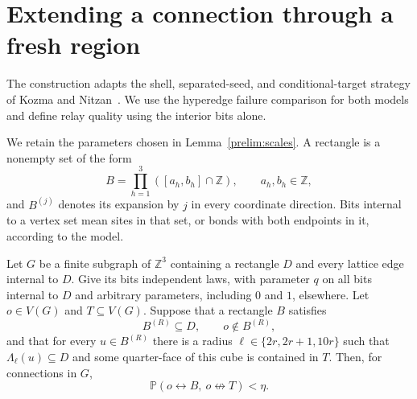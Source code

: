 \section{Extending a connection through a fresh region}
\label{sec:extension}

The construction adapts the shell, separated-seed, and conditional-target
strategy of Kozma and Nitzan~\cite[Section~4, Lemma~10]{KozmaNitzan2024}.
We use the hyperedge failure comparison for both models and define relay
quality using the interior bits alone.

We retain the parameters chosen in Lemma~\ref{prelim:scales}.
A rectangle is a nonempty set of the form
\[
 B=\prod_{h=1}^3([a_h,b_h]\cap\mathbb Z),
 \qquad a_h,b_h\in\mathbb Z,
\]
and $B^{(j)}$ denotes its expansion by $j$ in every coordinate direction.
Bits internal to a vertex set mean sites in that set, or bonds with both
endpoints in it, according to the model.

\begin{lemma}
\label{ext:estimate}
Let $G$ be a finite subgraph of $\mathbb Z^3$ containing a rectangle $D$
and every lattice edge internal to $D$.
Give its bits independent laws, with parameter $q$ on all bits internal
to $D$ and arbitrary parameters, including $0$ and $1$, elsewhere.
Let $o\in V(G)$ and $T\subseteq V(G)$.
Suppose that a rectangle $B$ satisfies
\[
 B^{(R)}\subseteq D,
 \qquad o\notin B^{(R)},
\]
and that for every $u\in B^{(R)}$ there is a radius
$\ell\in\{2r,2r+1,10r\}$ such that $\Lambda_\ell(u)\subseteq D$
and some quarter-face of this cube is contained in $T$.
Then, for connections in $G$,
\begin{equation}
 \mathbb P(o\leftrightarrow B,\ o\not\leftrightarrow T)<\eta.
 \label{ext:conclusion}
\end{equation}
\end{lemma}

